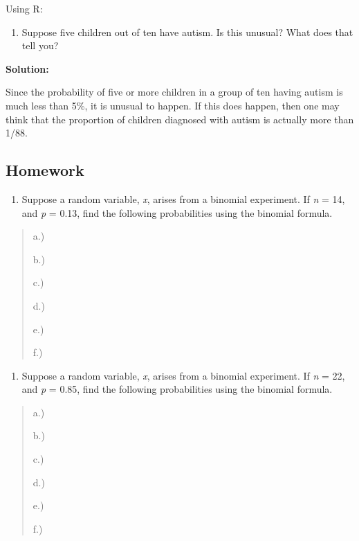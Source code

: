 \documentclass[]{book}
\providecommand{\tightlist}{%
  \setlength{\itemsep}{0pt}\setlength{\parskip}{0pt}}
\begin{document}
Using R:

\begin{enumerate}
\def\labelenumi{\alph{enumi}.}
\setcounter{enumi}{6}
\tightlist
\item
  Suppose five children out of ten have autism. Is this unusual? What
  does that tell you?
\end{enumerate}

\textbf{Solution:}

Since the probability of five or more children in a group of ten having
autism is much less than 5\%, it is unusual to happen. If this does
happen, then one may think that the proportion of children diagnosed
with autism is actually more than 1/88.

\hypertarget{homework-14}{%
\subsection{Homework}\label{homework-14}}

\begin{enumerate}
\def\labelenumi{\arabic{enumi}.}
\tightlist
\item
  Suppose a random variable, \emph{x}, arises from a binomial experiment. If \emph{n} = 14, and \emph{p} = 0.13, find the following probabilities using the binomial formula.
\end{enumerate}

\begin{quote}
a.)

b.)

c.)

d.)

e.)

f.)
\end{quote}

\begin{enumerate}
\def\labelenumi{\arabic{enumi}.}
\setcounter{enumi}{1}
\tightlist
\item
  Suppose a random variable, \emph{x}, arises from a binomial experiment. If \emph{n} = 22, and \emph{p} = 0.85, find the following probabilities using the binomial formula.
\end{enumerate}

\begin{quote}
a.)

b.)

c.)

d.)

e.)

f.)
\end{quote}
\end{document}
